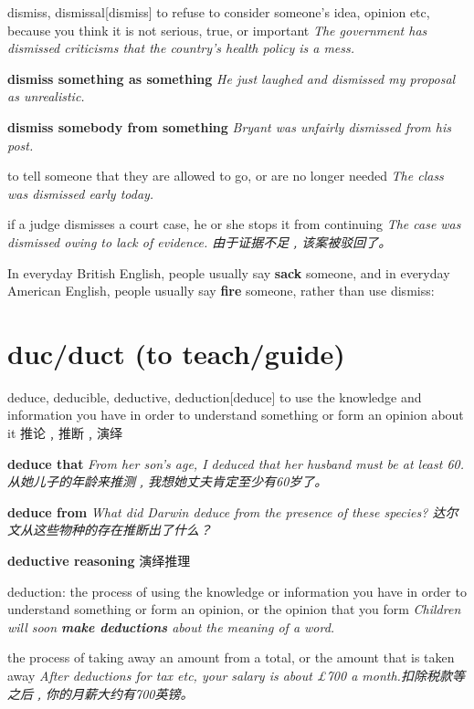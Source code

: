 \begin{DefWord}{dismiss, dismissal}[dismiss]
    to refuse to consider someone’s idea, opinion etc, because you think it is not serious, true, or important
    \textit{The government has dismissed criticisms that the country’s health policy is a mess.}

    \textbf{dismiss something as something}
    \textit{He just laughed and dismissed my proposal as unrealistic.}

    \textbf{dismiss somebody from something}
    \textit{ Bryant was unfairly dismissed from his post.}

    to tell someone that they are allowed to go, or are no longer needed
    \textit{The class was dismissed early today.}

    if a judge dismisses a court case, he or she stops it from continuing
    \textit{The case was dismissed owing to lack of evidence. 由于证据不足﹐该案被驳回了。}
\end{DefWord}

\begin{remark}
    In everyday British English, people usually say \textbf{sack} someone, and in everyday American English, people usually say \textbf{fire} someone, rather than use dismiss:
\end{remark}

\section{duc/duct (to teach/guide)}

\begin{DefWord}{deduce, deducible, deductive, deduction}[deduce]
    to use the knowledge and information you have in order to understand something or form an opinion about it 推论﹐推断﹐演绎

    \textbf{deduce that}
    \textit{From her son’s age, I deduced that her husband must be at least 60. 从她儿子的年龄来推测﹐我想她丈夫肯定至少有60岁了。}

    \textbf{deduce from}
    \textit{What did Darwin deduce from the presence of these species? 达尔文从这些物种的存在推断出了什么？}

    \textbf{deductive reasoning} 演绎推理

    deduction: the process of using the knowledge or information you have in order to understand something or form an opinion, or the opinion that you form
    \textit{Children will soon \textbf{make deductions} about the meaning of a word.}

    the process of taking away an amount from a total, or the amount that is taken away
    \textit{After deductions for tax etc, your salary is about £700 a month.扣除税款等之后﹐你的月薪大约有700英镑。}
\end{DefWord}

